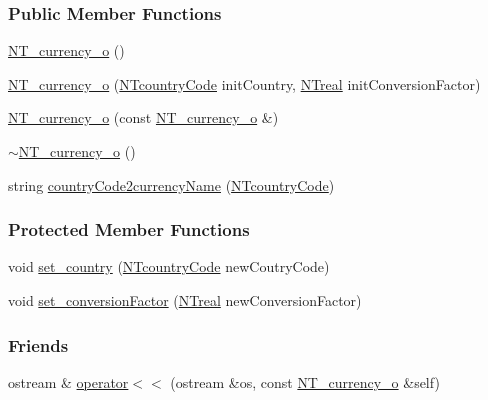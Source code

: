 \subsubsection*{Public Member Functions}
\begin{DoxyCompactItemize}
\item 
\hyperlink{class_n_t__currency__o_acf3762cf7fcfa639afcae4319aa8686e}{NT\_\-currency\_\-o} ()
\item 
\hyperlink{class_n_t__currency__o_a7a0d877202dbe30bca94486460fdac16}{NT\_\-currency\_\-o} (\hyperlink{nt__codes_8h_a191e0d46d9a7cf01d8861afa7c41eb88}{NTcountryCode} initCountry, \hyperlink{nt__types_8h_a814a97893e9deb1eedcc7604529ba80d}{NTreal} initConversionFactor)
\item 
\hyperlink{class_n_t__currency__o_a3b7ca07ec89b95b78eccd0c2aabd4e9f}{NT\_\-currency\_\-o} (const \hyperlink{class_n_t__currency__o}{NT\_\-currency\_\-o} \&)
\item 
\hyperlink{class_n_t__currency__o_aea2491a4c669fc274121521c01dd8145}{$\sim$NT\_\-currency\_\-o} ()
\item 
string \hyperlink{class_n_t__currency__o_a04de84fb276f9ebef460b11e356c3e51}{countryCode2currencyName} (\hyperlink{nt__codes_8h_a191e0d46d9a7cf01d8861afa7c41eb88}{NTcountryCode})
\end{DoxyCompactItemize}
\subsubsection*{Protected Member Functions}
\begin{DoxyCompactItemize}
\item 
void \hyperlink{class_n_t__currency__o_aa8fc11d85eebb7a04f4329396bff1c7d}{set\_\-country} (\hyperlink{nt__codes_8h_a191e0d46d9a7cf01d8861afa7c41eb88}{NTcountryCode} newCoutryCode)
\item 
void \hyperlink{class_n_t__currency__o_a34e7cbff6456a1cbeddbee8b5b0b87cb}{set\_\-conversionFactor} (\hyperlink{nt__types_8h_a814a97893e9deb1eedcc7604529ba80d}{NTreal} newConversionFactor)
\end{DoxyCompactItemize}
\subsubsection*{Friends}
\begin{DoxyCompactItemize}
\item 
ostream \& \hyperlink{class_n_t__currency__o_ab1e18620555fc217e70de5b3e04658e2}{operator$<$$<$} (ostream \&os, const \hyperlink{class_n_t__currency__o}{NT\_\-currency\_\-o} \&self)
\end{DoxyCompactItemize}


